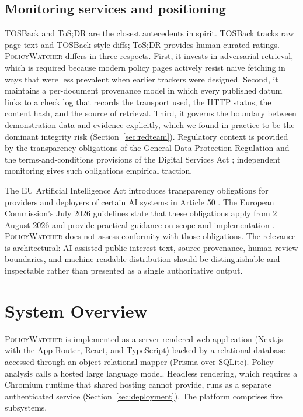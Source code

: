 \documentclass[11pt]{article}
\newcommand{\pw}{\textsc{PolicyWatcher}}
\begin{document}
\subsection{Monitoring services and positioning}
TOSBack \cite{tosback} and ToS;DR \cite{tosdr} are the closest antecedents in
spirit. TOSBack tracks raw page text and TOSBack-style diffs; ToS;DR provides
human-curated ratings. \pw{} differs in three respects. First, it invests in
adversarial retrieval, which is required because modern policy pages actively
resist naive fetching in ways that were less prevalent when earlier trackers
were designed. Second, it maintains a per-document provenance model in which
every published datum links to a check log that records the transport used, the
HTTP status, the content hash, and the source of retrieval. Third, it governs
the boundary between demonstration data and evidence explicitly, which we found
in practice to be the dominant integrity risk (Section~\ref{sec:redteam}).
Regulatory context is provided by the transparency obligations of the General
Data Protection Regulation \cite{gdpr} and the terms-and-conditions provisions
of the Digital Services Act \cite{dsa}; independent monitoring gives such
obligations empirical traction.

The EU Artificial Intelligence Act introduces transparency obligations for
providers and deployers of certain AI systems in Article 50
\cite{aiact}. The European Commission's July 2026 guidelines state that these
obligations apply from 2 August 2026 and provide practical guidance on scope and
implementation \cite{ecarticle50}. \pw{} does not assess conformity with those
obligations. The relevance is architectural: AI-assisted public-interest text,
source provenance, human-review boundaries, and machine-readable distribution
should be distinguishable and inspectable rather than presented as a single
authoritative output.

\section{System Overview}
\label{sec:overview}

\pw{} is implemented as a server-rendered web application (Next.js with the App
Router, React, and TypeScript) backed by a relational database accessed through
an object-relational mapper (Prisma over SQLite). Policy analysis calls a
hosted large language model. Headless rendering, which requires a Chromium
runtime that shared hosting cannot provide, runs as a separate authenticated
service (Section~\ref{sec:deployment}). The platform comprises five subsystems.
\end{document}
